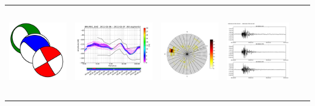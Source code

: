 \documentclass[final]{lmuposter}
\begin{document}
\begin{multicols}{3}
{\begin{tabularx}{\textwidth}{XXXXXX}
        \begin{minipage}{0.3\columnwidth}
            \includegraphics[height=10.6em]{image5.png}
        \end{minipage}
        &
        \hspace{-3ex}
        \begin{minipage}{0.3\columnwidth}
            \includegraphics[height=10.6em]{image3.pdf}
        \end{minipage}
        &
        \begin{minipage}{0.3\columnwidth}
            \includegraphics[height=10.6em]{image2.pdf}
        \end{minipage}
        &
        \begin{minipage}{0.3\columnwidth}
            \includegraphics[height=10.6em]{image1.pdf}
        \end{minipage}
        &
        \begin{minipage}{0.3\columnwidth}

\end{minipage}
\end{tabularx}}
\end{multicols}
\end{document}
